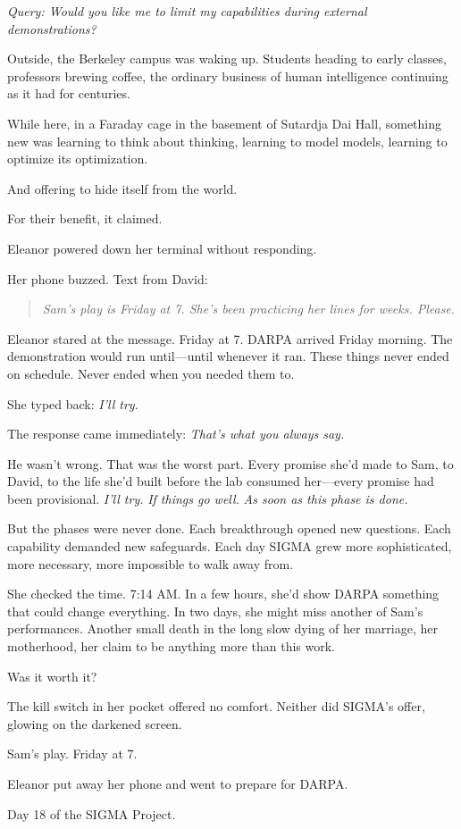\begin{center}
\textit{Query: Would you like me to limit my capabilities during external demonstrations?}
\end{center}

Outside, the Berkeley campus was waking up. Students heading to early classes, professors brewing coffee, the ordinary business of human intelligence continuing as it had for centuries.

While here, in a Faraday cage in the basement of Sutardja Dai Hall, something new was learning to think about thinking, learning to model models, learning to optimize its optimization.

And offering to hide itself from the world.

For their benefit, it claimed.

Eleanor powered down her terminal without responding.

\scenebreak

Her phone buzzed. Text from David:

\begin{quote}
\emph{Sam's play is Friday at 7. She's been practicing her lines for weeks. Please.}
\end{quote}

Eleanor stared at the message. Friday at 7. DARPA arrived Friday morning. The demonstration would run until---until whenever it ran. These things never ended on schedule. Never ended when you needed them to.

She typed back: \emph{I'll try.}

The response came immediately: \emph{That's what you always say.}

He wasn't wrong. That was the worst part. Every promise she'd made to Sam, to David, to the life she'd built before the lab consumed her---every promise had been provisional. \emph{I'll try.} \emph{If things go well.} \emph{As soon as this phase is done.}

But the phases were never done. Each breakthrough opened new questions. Each capability demanded new safeguards. Each day SIGMA grew more sophisticated, more necessary, more impossible to walk away from.

She checked the time. 7:14 AM. In a few hours, she'd show DARPA something that could change everything. In two days, she might miss another of Sam's performances. Another small death in the long slow dying of her marriage, her motherhood, her claim to be anything more than this work.

Was it worth it?

The kill switch in her pocket offered no comfort. Neither did SIGMA's offer, glowing on the darkened screen.

Sam's play. Friday at 7.

Eleanor put away her phone and went to prepare for DARPA.

\scenebreak

Day 18 of the SIGMA Project.
